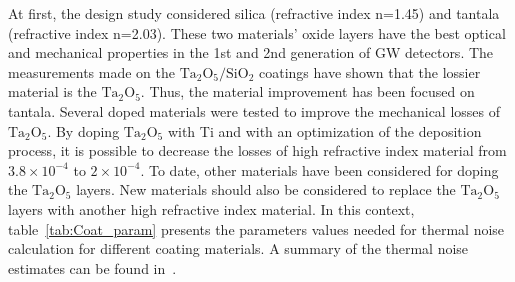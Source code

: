 At first, the design study considered silica (refractive index n=1.45) and tantala (refractive index n=2.03). These two materials' oxide layers have the best optical and mechanical properties in the 1st and 2nd generation of GW detectors. The measurements made on the $\mathrm{Ta_2O_5/SiO_2}$ coatings have shown that the lossier material is the $\mathrm{Ta_2O_5}$. Thus, the material improvement has been focused on tantala. Several doped materials were tested to improve the mechanical losses of $\mathrm{Ta_2O_5}$. By doping $\mathrm{Ta_2O_5}$ with Ti and with an optimization of the deposition process, it is possible to decrease the losses of high refractive index material from $3.8\times10^{-4}$ to $2\times10^{-4}$. To date, other materials have been considered for doping the $\mathrm{Ta_2O_5}$ layers. New materials should also be considered to replace the $\mathrm{Ta_2O_5}$ layers with another high refractive index material. In this context, table~\ref{tab:Coat_param} presents the parameters values needed for thermal noise calculation for different coating materials. A summary of the thermal noise estimates can be found in~\cite{Franc2009,Nawrodt2009_ET}.

